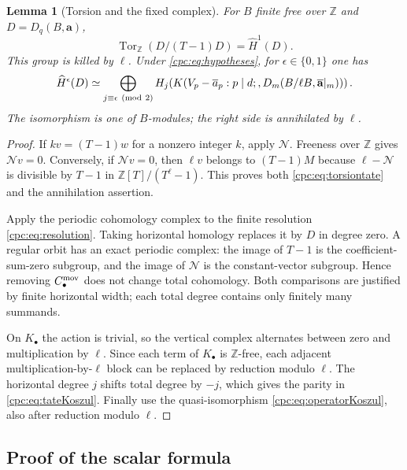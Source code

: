 \documentclass[11pt,a4paper]{article}
\numberwithin{equation}{section}
\newtheorem{lemma}[theorem]{Lemma}
\theoremstyle{definition}
\theoremstyle{remark}
\begin{document}
\begin{lemma}[Torsion and the fixed complex]
\label{cpc:lem:tate}
For $B$ finite free over $\mathbb Z$ and $D=D_q(B,\mathbf a)$,
\begin{equation}\label{cpc:eq:torsiontate}
 \operatorname{Tor}_{\mathbb Z}(D/(T-1)D)
       =\widehat H^1(D).
\end{equation}
This group is killed by $\ell$. Under
\eqref{cpc:eq:hypotheses}, for $\epsilon\in\{0,1\}$ one has
\begin{equation}\label{cpc:eq:tateKoszul}
 \widehat H^\epsilon(D)\simeq
 \bigoplus_{j\equiv\epsilon\ ({\rm mod}\ 2)}
 H_j\!\left(
 K(V_p-\overline a_p:p\mid d;,
        D_m(B/\ell B,\overline{\mathbf a}|_m))\right).
\end{equation}
The isomorphism is one of $B$-modules; the right side is annihilated
by $\ell$.
\end{lemma}
\begin{proof}
If $kv=(T-1)w$ for a nonzero integer $k$, apply $\mathcal N$.
Freeness over $\mathbb Z$ gives $\mathcal N v=0$. Conversely,
if $\mathcal N v=0$, then $\ell v$ belongs to $(T-1)M$ because
$\ell-\mathcal N$ is divisible by $T-1$ in
$\mathbb Z[T]/(T^\ell-1)$. This proves both
\eqref{cpc:eq:torsiontate} and the annihilation assertion.

Apply the periodic cohomology complex to the finite resolution
\eqref{cpc:eq:resolution}. Taking horizontal homology replaces it
by $D$ in degree zero. A regular orbit has an exact periodic complex:
the image of $T-1$ is the coefficient-sum-zero subgroup, and the image
of $\mathcal N$ is the constant-vector subgroup. Hence removing
$C_\bullet^{\rm mov}$ does not change total cohomology. Both
comparisons are justified by finite horizontal width; each total
degree contains only finitely many summands.

On $K_\bullet$ the action is trivial, so the vertical complex
alternates between zero and multiplication by $\ell$. Since each
term of $K_\bullet$ is $\mathbb Z$-free, each adjacent
multiplication-by-$\ell$ block can be replaced by reduction modulo
$\ell$. The horizontal degree $j$ shifts total degree by $-j$,
which gives the parity in \eqref{cpc:eq:tateKoszul}. Finally use
the quasi-isomorphism \eqref{cpc:eq:operatorKoszul}, also after
reduction modulo $\ell$.
\end{proof}

\subsection{Proof of the scalar formula}
\end{document}
